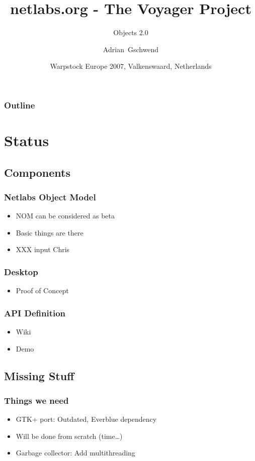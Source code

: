 \documentclass{beamer}
\title[netlabs.org - The Voyager Project]
{netlabs.org - The Voyager Project}
\subtitle
{Objects 2.0}
\author[Adrian Gschwend]
{Adrian~Gschwend}
\institute[netlabs.org]
{
netlabs.org - Open Source Software
}
\date[3.11.2007]
{Warpstock Europe 2007, Valkenswaard, Netherlands}
\begin{document}
\begin{frame}
\titlepage
\end{frame}

\begin{frame}
\frametitle{Outline}
\tableofcontents[hideallsubsections]
\end{frame}

\section{Status}

\subsection{Components}

\begin{frame}
\frametitle{Netlabs Object Model}
\begin{itemize}
  \item NOM can be considered as beta
  \item Basic things are there
  \item XXX input Chris
\end{itemize}
\end{frame}

\begin{frame}
\frametitle{Desktop}
\begin{itemize}
  \item Proof of Concept
\end{itemize}
\end{frame}

\begin{frame}
\frametitle{API Definition}
\begin{itemize}
  \item Wiki
  \item Demo
\end{itemize}
\end{frame}


\subsection{Missing Stuff}

\begin{frame}
\frametitle{Things we need}
\begin{itemize}
  \item GTK+ port: Outdated, Everblue dependency
  \item Will be done from scratch (time\ldots)
  \item Garbage collector: Add multithreading
\end{itemize}
\end{frame}
\end{document}
